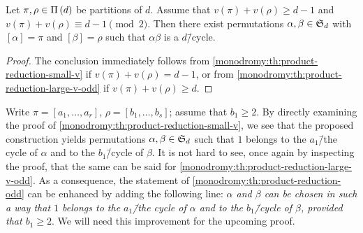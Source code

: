 \begin{corollary}\label{monodromy:th:product-reduction-odd}
Let $\pi,\rho\in\Pi\left(d\right)$ be partitions of $d$. Assume that $v(\pi)+v(\rho)\ge d-1$ and $v(\pi)+v(\rho)\equiv d-1\pmod{2}$. Then there exist permutations $\alpha,\beta\in\symgroup[d]$ with $[\alpha]=\pi$ and $[\beta]=\rho$ such that $\alpha\beta$ is a $d$\=/cycle.
\end{corollary}
\begin{proof}
The conclusion immediately follows from \cref{monodromy:th:product-reduction-small-v} if $v(\pi)+v(\rho)=d-1$, or from \cref{monodromy:th:product-reduction-large-v-odd} if $v(\pi)+v(\rho)\ge d$.
\end{proof}

\begin{remark}\label{monodromy:rm:product-reduction-odd-prescribed-cycles}
Write $\pi=[a_1,\ldots,a_r]$, $\rho=[b_1,\ldots,b_s]$; assume that $b_1\ge 2$. By directly examining the proof of \cref{monodromy:th:product-reduction-small-v}, we see that the proposed construction yields permutations $\alpha,\beta\in\symgroup[d]$ such that $1$ belongs to the $a_1$\=/the cycle of $\alpha$ and to the $b_1$\=/cycle of $\beta$. It is not hard to see, once again by inspecting the proof, that the same can be said for \cref{monodromy:th:product-reduction-large-v-odd}. As a consequence, the statement of \cref{monodromy:th:product-reduction-odd} can be enhanced by adding the following line: \emph{$\alpha$ and $\beta$ can be chosen in such a way that $1$ belongs to the $a_1$\=/the cycle of $\alpha$ and to the $b_1$\=/cycle of $\beta$, provided that $b_1\ge 2$}. We will need this improvement for the upcoming proof.
\end{remark}

